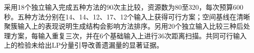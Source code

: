采用18个独立输入完成五种方法的90次主比较，资源数为80至320，每次预算600秒。五种方法分别在14、14、12、17、12个输入上获得可行方案；空间基线在清晰聚簇输入上的表现说明生成结构会影响方法排序。另用20个独立输入比较三种后处理方案，每输入重复三次，并在6个基础输入上进行36次距离扫描。共同可行输入上的检验未给出LP分量引导改善遗漏量的显著证据。
